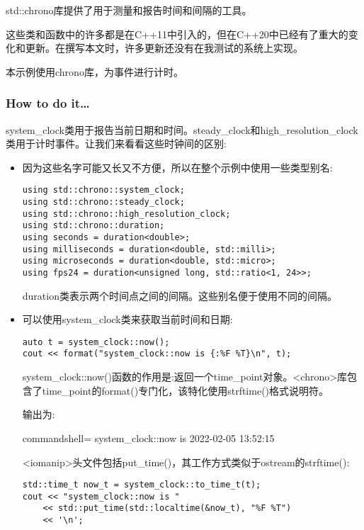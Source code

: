 
std::chrono库提供了用于测量和报告时间和间隔的工具。

这些类和函数中的许多都是在C++11中引入的，但在C++20中已经有了重大的变化和更新。在撰写本文时，许多更新还没有在我测试的系统上实现。

本示例使用chrono库，为事件进行计时。

\subsubsection{How to do it…}

system\_clock类用于报告当前日期和时间。steady\_clock和high\_resolution\_clock类用于计时事件。让我们来看看这些时钟间的区别:

\begin{itemize}
\item 
因为这些名字可能又长又不方便，所以在整个示例中使用一些类型别名:

\begin{lstlisting}[style=styleCXX]
using std::chrono::system_clock;
using std::chrono::steady_clock;
using std::chrono::high_resolution_clock;
using std::chrono::duration;
using seconds = duration<double>;
using milliseconds = duration<double, std::milli>;
using microseconds = duration<double, std::micro>;
using fps24 = duration<unsigned long, std::ratio<1, 24>>;
\end{lstlisting}

duration类表示两个时间点之间的间隔。这些别名便于使用不同的间隔。

\item 
可以使用system\_clock类来获取当前时间和日期:

\begin{lstlisting}[style=styleCXX]
auto t = system_clock::now();
cout << format("system_clock::now is {:%F %T}\n", t);
\end{lstlisting}

system\_clock::now()函数的作用是:返回一个time\_point对象。<chrono>库包含了time\_point的format()专门化，该特化使用strftime()格式说明符。

输出为:

\begin{tcblisting}{commandshell={}}
system_clock::now is 2022-02-05 13:52:15
\end{tcblisting}

<iomanip>头文件包括put\_time()，其工作方式类似于ostream的strftime():

\begin{lstlisting}[style=styleCXX]
std::time_t now_t = system_clock::to_time_t(t);
cout << "system_clock::now is "
	<< std::put_time(std::localtime(&now_t), "%F %T")
	<< '\n';
\end{lstlisting}


\end{itemize}
